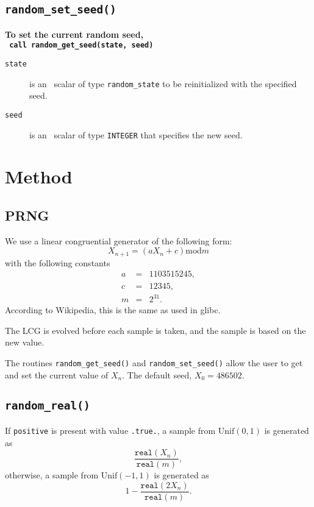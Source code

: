 \subsection{\texttt{random\_set\_seed()}}

\textbf{\noindent
   To set the current random seed,
   \vspace*{0.1cm} \\
   \texttt{ \hspace*{0.2cm}
      call random\_get\_seed(state, seed)
   }
   \vspace{0.3cm}
}

\begin{description}

\item[\texttt{state}] is an \intentinout\ scalar of type {\tt random\_state} to
   be reinitialized with the specified seed.

\item[\texttt{seed}] is an \intentin\ scalar of type {\tt INTEGER} that
   specifies the new seed.

\end{description}

\section{Method} \label{method}

\subsection{PRNG}
We use a linear congruential generator of the following form:
$$
   X_{n+1} = (aX_n + c) \mathrm{mod} m
$$
with the following constants
\begin{eqnarray*}
   a &=& 1103515245, \\
   c &=& 12345, \\
   m &=& 2^{31}.
\end{eqnarray*}
According to Wikipedia, this is the same as used in glibc.

The LCG is evolved before each sample is taken, and the sample is based on the
new value.

The routines {\tt random\_get\_seed()} and {\tt random\_set\_seed()} allow the user to get and set the current value of $X_n$. The default seed, $X_0 = 486502$.

\subsection{\tt random\_real()}
If {\tt positive} is present with value {\tt .true.}, a sample from $\mathrm{Unif}(0,1)$ is generated as
$$
   \frac{\texttt{real}(X_n)}{\texttt{real}(m)},
$$
otherwise, a sample from $\mathrm{Unif}(-1,1)$ is generated as
$$
   1 - \frac{\texttt{real}(2X_n)}{\texttt{real}(m)}.
$$

